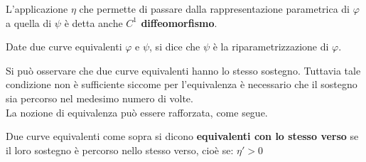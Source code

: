 \begin{definition}
    L'applicazione $\eta$ che permette di passare dalla rappresentazione parametrica di $\varphi$ a quella di $\psi$ è detta anche \textbf{$C^1$ diffeomorfismo}.
\end{definition}
\begin{definition}
    Date due curve equivalenti $\varphi$ e $\psi$, si dice che $\psi$ è la riparametrizzazione di $\varphi$.
\end{definition}
Si può osservare che due curve equivalenti hanno lo stesso sostegno. Tuttavia tale condizione non è sufficiente siccome per l'equivalenza è necessario che il sostegno sia percorso nel medesimo numero di volte.\\
La nozione di equivalenza può essere rafforzata, come segue.
\begin{definition}
    Due curve equivalenti come sopra si dicono \textbf{equivalenti con lo stesso verso} se il loro sostegno è percorso nello stesso verso, cioè se: $\eta'>0$
\end{definition}

